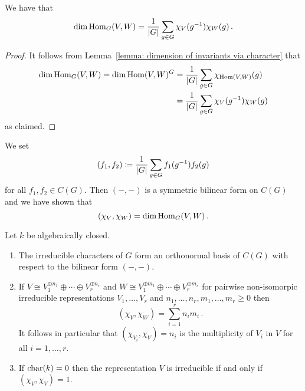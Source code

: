 

\begin{corollary}
  \label{corollary: dim of Hom via characters}
  We have that
  \[
      \dim \operatorname{Hom}_G(V,W)
    = \frac{1}{|G|} \sum_{g \in G} \chi_V(g^{-1}) \chi_W(g) \,.
  \]
\end{corollary}


\begin{proof}
  It follows from Lemma~\ref{lemma: dimension of invariants via character} that
  \begin{align*}
        \dim \operatorname{Hom}_G(V,W)
     =  \dim \operatorname{Hom}(V,W)^G
    &=  \frac{1}{|G|} \sum_{g \in G} \chi_{\operatorname{Hom}(V,W)}(g)  \\
    &=  \frac{1}{|G|} \sum_{g \in G} \chi_V(g^{-1}) \chi_W(g)
  \end{align*}
  as claimed.
\end{proof}



\begin{fluff}
  We set
  \[
              (f_1, f_2)
    \coloneqq  \frac{1}{|G|} \sum_{g \in G} f_1(g^{-1}) f_2(g)
  \]
  for all $f_1, f_2 \in C(G)$.
  Then $(-,-)$ is a symmetric bilinear form on $C(G)$ and we have shown that
  \[
      (\chi_V, \chi_W)
    = \dim \operatorname{Hom}_G(V,W) \,.
  \]
\end{fluff}




\begin{theorem}
  Let $k$ be algebraically closed.
  \begin{enumerate}
    \item
      \label{enumerate: irred char are onb}
      The irreducible characters of $G$ form an orthonormal basis of $C(G)$ with respect to the bilinear form $(-,-)$.
    \item
      If $V \cong V_1^{\oplus n_1} \oplus \dotsb \oplus V_r^{\oplus n_r}$ and $W \cong V_1^{\oplus m_1} \oplus \dotsb \oplus V_r^{\oplus m_r}$ for pairwise non-isomorpic irreducible representations $V_1, \dotsc, V_r$ and $n_1, \dotsc, n_r, m_1, \dotsc, m_r \geq 0$ then
      \[
          (\chi_V, \chi_W)
        = \sum_{i=1}^r n_i m_i \,.
      \]
      It follows in particular that $(\chi_{V_i}, \chi_V) = n_i$ is the multiplicity of $V_i$ in $V$ for all $i = 1, \dotsc, r$.
    \item
      If $\operatorname{char}(k) = 0$ then the representation $V$ is irreducible if and only if $(\chi_V, \chi_V) = 1$.
  \end{enumerate}
\end{theorem}


